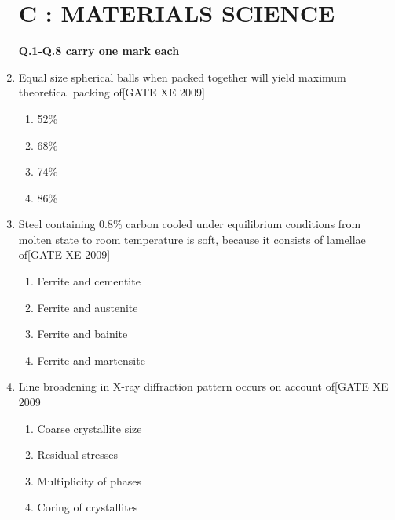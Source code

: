 \documentclass[journal,12pt,onecolumn]{IEEEtran}
\theoremstyle{remark}
\begin{document}
\begin{enumerate}
\section*{C : MATERIALS SCIENCE}





\textbf{Q.1-Q.8 carry one mark each}


\item[\textbf{Q.1}] Equal size spherical balls when packed together will yield maximum theoretical packing of\hfill[GATE XE 2009]

\begin{multicols}{2}
\begin{enumerate}
    \item 52\%
    \item 68\%
    \item 74\%
    \item 86\%
\end{enumerate}
\end{multicols}

\vspace{0.3cm}

\item[\textbf{Q.2}] Steel containing 0.8\% carbon cooled under equilibrium conditions from molten state to room temperature is soft, because it consists of lamellae of\hfill[GATE XE 2009]

\begin{multicols}{2}
\begin{enumerate}
    \item Ferrite and cementite
    \item Ferrite and austenite
    \item Ferrite and bainite
    \item Ferrite and martensite
\end{enumerate}
\end{multicols}

\vspace{0.3cm}

\item[\textbf{Q.3}] Line broadening in X-ray diffraction pattern occurs on account of\hfill[GATE XE 2009]

\begin{multicols}{2}
\begin{enumerate}
    \item Coarse crystallite size
    \item Residual stresses
    \item Multiplicity of phases
    \item Coring of crystallites
\end{enumerate}
\end{multicols}


\end{enumerate}
\end{document}

